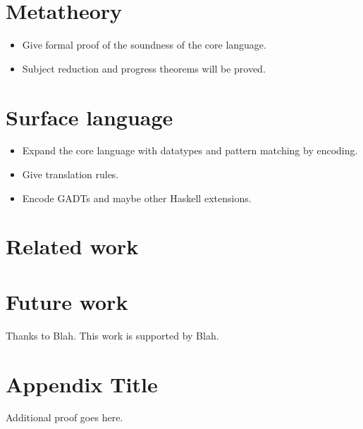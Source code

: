 \documentclass[preprint]{sigplanconf}
\begin{document}
\section{Metatheory}
\begin{itemize}
\item Give formal proof of the soundness of the core language.
\item Subject reduction and progress theorems will be proved.
\end{itemize}

\section{Surface language}
\begin{itemize}
\item Expand the core language with datatypes and pattern matching by encoding.
\item Give translation rules.
\item Encode GADTs and maybe other Haskell extensions.
\end{itemize}

\section{Related work}

\section{Future work}


\acks
Thanks to Blah. This work is supported by Blah.


\nocite{*}



\appendix
\section{Appendix Title}
Additional proof goes here.

\end{document}
